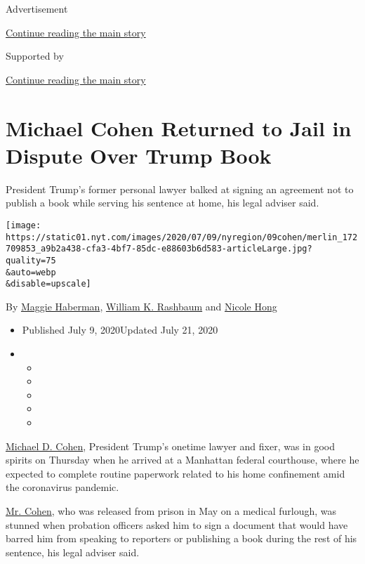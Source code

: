 Advertisement

\protect\hyperlink{after-top}{Continue reading the main story}

Supported by

\protect\hyperlink{after-sponsor}{Continue reading the main story}

\hypertarget{michael-cohen-returned-to-jail-in-dispute-over-trump-book}{%
\section{Michael Cohen Returned to Jail in Dispute Over Trump
Book}\label{michael-cohen-returned-to-jail-in-dispute-over-trump-book}}

President Trump's former personal lawyer balked at signing an agreement
not to publish a book while serving his sentence at home, his legal
adviser said.

\texttt{[image: https://static01.nyt.com/images/2020/07/09/nyregion/09cohen/merlin\_172709853\_a9b2a438-cfa3-4bf7-85dc-e88603b6d583-articleLarge.jpg?quality=75\\\&auto=webp\\\&disable=upscale]}

By \href{https://www.nytimes.com/by/maggie-haberman}{Maggie Haberman},
\href{https://www.nytimes.com/by/william-k-rashbaum}{William K.
Rashbaum} and \href{https://www.nytimes.com/by/nicole-hong}{Nicole Hong}

\begin{itemize}
\item
  Published July 9, 2020Updated July 21, 2020
\item
  \begin{itemize}
  \item
  \item
  \item
  \item
  \item
  \end{itemize}
\end{itemize}

\href{https://www.nytimes.com/2020/07/23/nyregion/michael-cohen-trump-book.html}{Michael
D. Cohen}, President Trump's onetime lawyer and fixer, was in good
spirits on Thursday when he arrived at a Manhattan federal courthouse,
where he expected to complete routine paperwork related to his home
confinement amid the coronavirus pandemic.

\href{https://www.nytimes.com/2020/07/22/nyregion/michael-cohen-donald-trump-prison.html}{Mr.
Cohen}, who was released from prison in May on a medical furlough, was
stunned when probation officers asked him to sign a document that would
have barred him from speaking to reporters or publishing a book during
the rest of his sentence, his legal adviser said.

